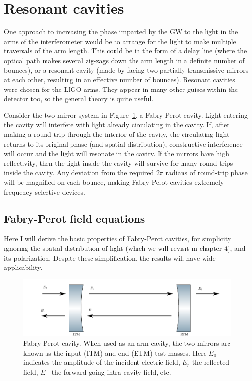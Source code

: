 \section{Resonant cavities}

One approach to increasing the phase imparted by the GW to the light
in the arms of the interferometer would be to arrange for the light to
make multiple traversals of the arm length.  This could be in the form
of a delay line (where the optical path makes several zig-zags down
the arm length in a definite number of bounces), or a resonant cavity
(made by facing two partially-transmissive mirrors at each other,
resulting in an effective number of bounces).  Resonant cavities were
chosen for the LIGO arms.  They appear in many other guises within the
detector too, so the general theory is quite useful.

Consider the two-mirror system in Figure~\ref{fig:fabry-perot}, a
Fabry-Perot cavity.  Light entering the cavity will interfere with
light already circulating in the cavity.  If, after making a
round-trip through the interior of the cavity, the circulating light
returns to its original phase (and spatial distribution), constructive
interference will occur and the light will resonate in the cavity.  If
the mirrors have high reflectivity, then the light inside the cavity
will survive for many round-trips inside the cavity. Any deviation from the
required $2\pi$ radians of round-trip phase will be magnified on each
bounce, making Fabry-Perot cavities extremely frequency-selective
devices.

\subsection{Fabry-Perot field equations}
Here I will derive the basic properties of Fabry-Perot cavities, for
simplicity ignoring the spatial distribution of light (which we will
revisit in chapter 4), and its polarization.  Despite these
simplification, the results will have wide applicability.

\begin{figure}
\includegraphics[]{figures/cavity.pdf}
\caption[Fabry-Perot Cavity]{\label{fig:fabry-perot}Fabry-Perot
  cavity.  When used as an arm cavity, the two mirrors are known as
  the input (ITM) and end (ETM) test masses.  Here $E_0$ indicates the
  amplitude of the incident electric field, $E_r$ the reflected field,
  $E_+$ the forward-going intra-cavity field, etc.}
\end{figure}

